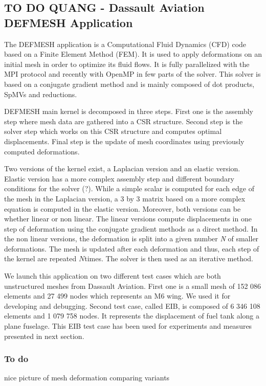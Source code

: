 \documentclass{IOS-Book-Article}
\begin{document}
\subsection{TO DO QUANG - Dassault Aviation DEFMESH Application}
The DEFMESH application is a Computational Fluid Dynamics (CFD) code based on a Finite Element Method (FEM).
It is used to apply deformations on an initial mesh in order to optimize its fluid flows.
It is fully parallelized with the MPI protocol and recently with OpenMP in few parts of the solver.
This solver is based on a conjugate gradient method and is mainly composed of dot products, SpMVs and reductions.

DEFMESH main kernel is decomposed in three steps.
First one is the assembly step where mesh data are gathered into a CSR structure.
Second step is the solver step which works on this CSR structure and computes optimal displacements.
Final step is the update of mesh coordinates using previously computed deformations.

Two versions of the kernel exist, a Laplacian version and an elastic version. Elastic version has a more complex assembly step and different boundary conditions for the solver (?).
While a simple scalar is computed for each edge of the mesh in the Laplacian version, a 3 by 3 matrix based on a more complex equation is computed in the elastic version.
Moreover, both versions can be whether linear or non linear.
The linear versions compute displacements in one step of deformation using the conjugate gradient methods as a direct method.
In the non linear versions, the deformation is split into a given number \emph{N} of smaller deformations.
The mesh is updated after each deformation and thus, each step of the kernel are repeated $N$times. The solver is then used as an iterative method.

We launch this application on two different test cases which are both unstructured meshes from Dassault Aviation.
First one is a small mesh of 152 086 elements and 27 499 nodes which represents an M6 wing. We used it for developing and debugging.
Second test case, called EIB, is composed of 6 346 108 elements and 1 079 758 nodes. It represents the displacement of fuel tank along a plane fuselage.
This EIB test case has been used for experiments and measures presented in next section.

\subsubsection{To do}
nice picture of mesh deformation comparing variants\\
\end{document}
